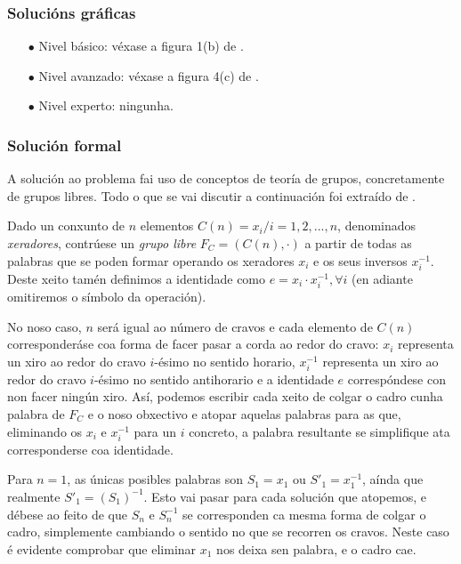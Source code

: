 \begin{refsection}
\begin{multicols}{2}
\subsubsection*{Solucións gráficas}

\begin{itemize}
    \item[$\bullet$] Nivel básico: véxase a figura 1(b) de \cite{Demaine_2013}.
    \item[$\bullet$] Nivel avanzado: véxase a figura 4(c) de \cite{Demaine_2013}.
    \item[$\bullet$] Nivel experto: ningunha.
\end{itemize}

\subsubsection*{Solución formal}

A solución ao problema fai uso de conceptos de teoría de grupos, concretamente
de grupos libres. Todo o que se vai discutir a continuación foi extraído de
\cite{Demaine_2013}.

Dado un conxunto de $n$ elementos $C(n) = {x_i / i=1,2,...,n}$, denominados
\textit{xeradores}, contrúese un \textit{grupo libre} $F_C = (C(n),\cdot)$ a
partir de todas as palabras que se poden formar operando os xeradores $x_i$ e
os seus inversos $x_i^{-1}$. Deste xeito tamén definimos a identidade como $e =
x_i \cdot x_i^{-1}, \forall i$ (en adiante omitiremos o símbolo da operación).

No noso caso, $n$ será igual ao número de cravos e cada elemento de $C(n)$
corresponderáse coa forma de facer pasar a corda ao redor do cravo: $x_i$
representa un xiro ao redor do cravo $i$-ésimo no sentido horario, $x_i^{-1}$
representa un xiro ao redor do cravo $i$-ésimo no sentido antihorario e a
identidade $e$ correspóndese con non facer ningún xiro. Así, podemos escribir
cada xeito de colgar o cadro cunha palabra de $F_C$ e o noso obxectivo e atopar
aquelas palabras para as que, eliminando os $x_i$ e $x_i^{-1}$ para un $i$
concreto, a palabra resultante se simplifique ata corresponderse coa
identidade.

Para $n=1$, as únicas posibles palabras son $S_1 = x_1$ ou $S'_1=x_1^{-1}$,
aínda que realmente $S'_1 = (S_1)^{-1}$. Esto vai pasar para cada solución que
atopemos, e débese ao feito de que $S_n$ e $S_n^{-1}$ se corresponden ca mesma
forma de colgar o cadro, simplemente cambiando o sentido no que se recorren os
cravos. Neste caso é evidente comprobar que eliminar $x_1$ nos deixa sen
palabra, e o cadro cae.


\end{multicols}
\end{refsection}
